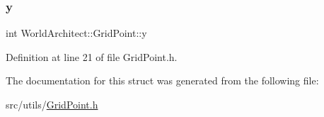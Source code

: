 \subsubsection{\texorpdfstring{y}{y}}
{\footnotesize\ttfamily int World\+Architect\+::\+Grid\+Point\+::y}



Definition at line 21 of file Grid\+Point.\+h.



The documentation for this struct was generated from the following file\+:\begin{DoxyCompactItemize}
\item 
src/utils/\mbox{\hyperlink{_grid_point_8h}{Grid\+Point.\+h}}\end{DoxyCompactItemize}
